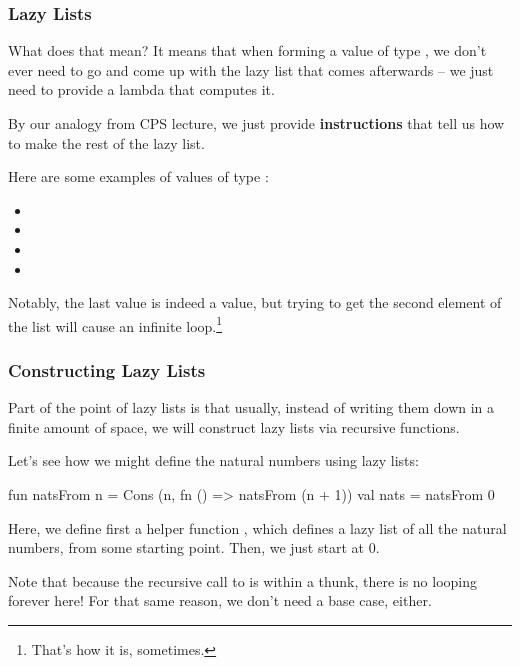 \documentclass[aspectratio=169]{beamer}
\begin{document}
\begin{frame}[fragile]
  \frametitle{Lazy Lists}

  What does that mean? It means that when forming a value of type ,
  we don't ever need to go and come up with the lazy list that comes afterwards --
  we just need to provide a lambda that computes it.

  \pause
  \vspace{\fill}

  By our analogy from CPS lecture, we just provide \textbf{instructions} that
  tell us how to make the rest of the lazy list.

  \pause
  \vspace{\fill}

  Here are some examples of values of type :
  \pause
  \begin{itemize}
    \item {} \pause
    \item {} \pause
    \item {} \pause
    \item {}
  \end{itemize}

  \pause
  \vspace{\fill}

  Notably, the last value is indeed a value, but trying to get the second
  element of the list will cause an infinite loop.\footnote{That's how it is, sometimes.}
\end{frame}

\begin{frame}[fragile]
  \frametitle{Constructing Lazy Lists}

  \rprs

  Part of the point of lazy lists is that usually, instead of writing them down
  in a finite amount of space, we will construct lazy lists via recursive functions.

  \pause
  \vspace{\fill}

  Let's see how we might define the natural numbers using lazy lists:
  \begin{codeblock}
    fun natsFrom n = Cons (n, fn () => natsFrom (n + 1))
    val nats = natsFrom 0
  \end{codeblock}

  \pause
  \vspace{\fill}

  Here, we define first a helper function , which defines a
  lazy list of all the natural numbers, from some starting point. Then, we just
  start at 0.

  \pause
  \vspace{\fill}

  Note that because the recursive call to  is within a thunk,
  there is no looping forever here! For that same reason, we don't need a base
  case, either.
\end{frame}
\end{document}
